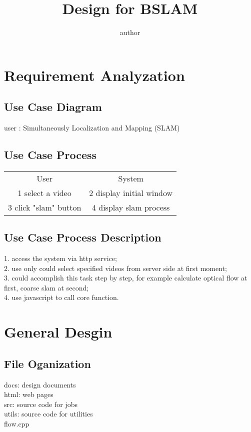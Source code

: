 \documentclass{article}
\title { Design for BSLAM }
\author{author}
\begin{document}
\maketitle


\section{Requirement Analyzation}

\subsection{Use Case Diagram}

user : Simultaneously Localization and Mapping (SLAM)

\subsection{Use Case Process}

\begin{tabular}{c c}

User&System\\
1 select a video & 2 display initial window\\
3 click "slam" button & 4 display slam process\\
\end{tabular}

\subsection{Use Case Process Description}
1. access the system via http service;\\
2. use only could select specified videos from server side at first moment;\\
3. could accomplish this task step by step, for example calculate optical flow at first, coarse slam at second;\\
4. use javascript to call core function.

\section{General Desgin}

\subsection{File Oganization}
docs: design documents\\
html: web pages\\
src: source code for jobs\\
utils: source code for utilities\\
\indent flow.cpp
\end{document}
